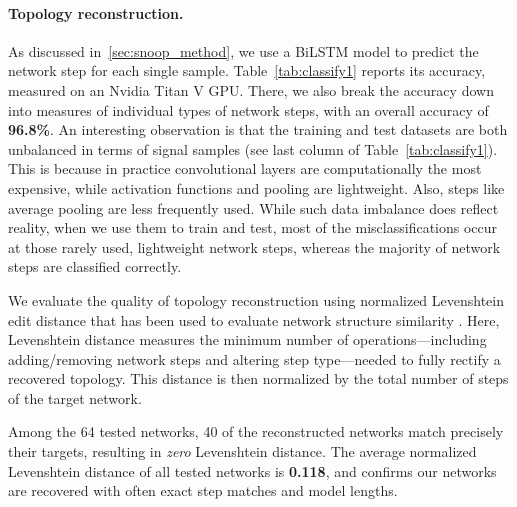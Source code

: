 \documentclass[12pt]{report}
\begin{document}
\paragraph{Topology reconstruction.}
As discussed in~\ref{sec:snoop_method}, we use a BiLSTM model
to predict the network step for each single sample.
Table~\ref{tab:classify1} reports its accuracy, measured on an Nvidia Titan V GPU. %
There, we also break the accuracy down into measures of individual types of network steps, with an overall accuracy of \textbf{96.8\%}.
An interesting observation is that the training and test datasets are both
unbalanced in terms of signal samples (see last column of Table~\ref{tab:classify1}).
This is because in practice convolutional layers are computationally the most
expensive, while activation functions and pooling are lightweight.
Also, steps like average pooling are less frequently used.
While such data imbalance does reflect reality, when
we use them to train and test, most of the misclassifications occur at those
rarely used, lightweight network steps, whereas the majority of network steps
are classified correctly.

We evaluate the quality of topology reconstruction using
normalized Levenshtein edit distance that 
has been used to evaluate network structure similarity \cite{graves2006connectionist, hu2020deepsniffer}.
Here, Levenshtein distance measures the minimum number of operations---including
adding/removing network steps and altering step type---needed to 
fully rectify a recovered topology. %
This distance is then normalized by the total number of steps of the target network.

Among the 64 tested networks, 40 of the reconstructed
networks match precisely their targets, resulting in \emph{zero} Levenshtein distance.
The average normalized Levenshtein distance of all tested networks is \textbf{0.118},
and confirms our networks are recovered with often exact
step matches and model lengths.
\end{document}
